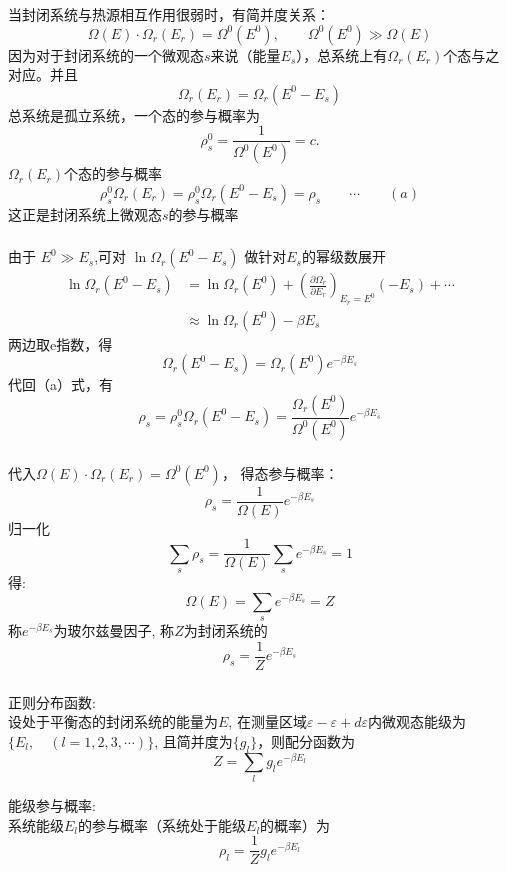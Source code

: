 \begin{frame}
  \frametitle{}
  当封闭系统与热源相互作用很弱时，有简并度关系：\[ \Omega(E) \cdot \Omega _r(E_r) = \Omega ^0 (E^0), \qquad \Omega ^0 (E^0) \gg \Omega(E)\]
  因为对于封闭系统的一个微观态$s$来说（能量$E_s$），总系统上有$\Omega _r (E_r)$个态与之对应。并且
  \[\Omega _r (E_r) = \Omega _r(E^0 - E_s) \] 
  总系统是孤立系统，一个态的参与概率为
  \[ \rho ^0 _s = \frac{1}{\Omega^0 (E^0)} =c. \]
  $\Omega _r (E_r)$个态的参与概率
  \[ \rho ^0 _s \Omega _r (E_r)  =\rho ^0 _s  \Omega _r (E^0 - E_s)  = \rho _s \qquad \cdots \qquad (a)\]
  这正是封闭系统上微观态$s$的参与概率
\end{frame} 

\begin{frame}
  \frametitle{}
由于 $ E^0 \gg E_s $,可对  $ \ln \Omega _r (E^0 - E_s) $ 做针对$ E_s$的幂级数展开
\[ 
\begin{aligned}
  \ln \Omega _r (E^0 - E_s)  &=  \ln \Omega _r (E^0) + \left(\frac{\partial \Omega _r }{\partial E_r}\right)_{E_r =E^0} (-E_s) +\cdots \\ 
  & \approx \ln \Omega _r (E^0) - \beta  E_s 
\end{aligned}  
\] 
两边取e指数，得
\[ \Omega _r (E^0 - E_s) = \Omega _r (E^0) e^{- \beta E_s }\]
代回（a）式，有
\[\rho _s  =\rho ^0 _s  \Omega _r (E^0 - E_s)  =  \frac{\Omega _r (E^0)}{\Omega^0 (E^0)} e^{- \beta E_s}\]
\end{frame} 

\begin{frame}
  \frametitle{}
代入$\Omega(E) \cdot \Omega _r(E_r) = \Omega ^0 (E^0)$， 得态参与概率：
\[\rho _s  =  \frac{1}{\Omega(E)} e^{- \beta E_s}\] 
归一化
\[\sum_s \rho _s  = \frac{1}{\Omega(E)} \sum_s e^{- \beta E_s} =1 \]
得: 
\[\Omega(E) = \sum_s e^{- \beta E_s} = Z\]
称$ e^{- \beta E_s}  $为玻尔兹曼因子, 称$Z$为封闭系统的\emf[配分函数]  \\
\emf[微观态参与概率：] 
\begin{equation}
  \boxed{\rho _s  =  \frac{1}{Z} e^{- \beta E_s}} 
\end{equation}
\end{frame} 

\begin{frame}
  \frametitle{}
  \alert{正则分布函数:} \\ 
  设处于平衡态的封闭系统的能量为$E$, 在测量区域$\varepsilon - \varepsilon+ d\varepsilon $内微观态能级为$\{ E_l, \quad (l=1,2,3,\cdots )\}$, 且简并度为$\{ g_l \}$，则配分函数为
  \[ Z= \sum_l g_l e^{- \beta E_l } \]  

  \alert{能级参与概率:}  \\
  系统能级$ E_l $的参与概率（系统处于能级$ E_l $的概率）为 
  \begin{equation}
    \boxed{\rho _l  =  \frac{1}{Z} g_l e^{- \beta E_l}} 
  \end{equation}
\end{frame} 



